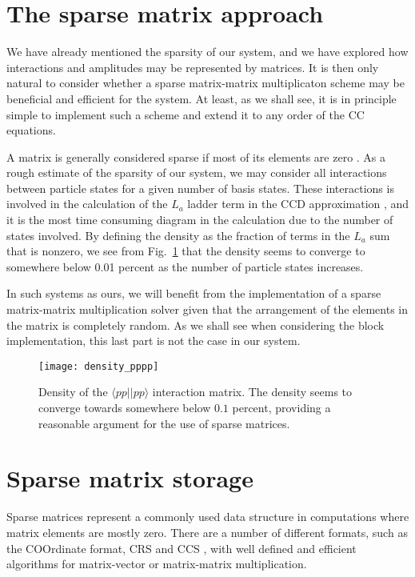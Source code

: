 \section{The sparse matrix approach}

We have already mentioned the sparsity of our system, and we have explored how interactions and amplitudes may be represented by matrices. It is then only natural to consider whether a sparse matrix-matrix  multiplicaton scheme may be beneficial and efficient for the system. At least, as we shall see, it is in principle simple to implement such a scheme and extend it to any order of the CC equations.

A matrix is generally considered sparse if most of its elements are
zero \cite[p.122]{Lay}. As a rough estimate of the sparsity of our
system, we may consider all interactions between particle states for a
given number of basis states. These interactions is involved in the
calculation of the $L_a$ ladder term in the CCD approximation
\cite{ShavittBartlett2009}, and it is the most time consuming diagram
in the calculation due to the number of states involved. By defining
the density as the fraction of terms in the $L_a$ sum that is nonzero,
we see from Fig.~\ref{fig:density_vpppp} that the density seems to
converge to somewhere below 0.01 percent as the number of particle
states increases.

In such systems as ours, we will benefit from the implementation of a
sparse matrix-matrix multiplication solver given that the arrangement
of the elements in the matrix is completely random. As we shall see
when considering the block implementation, this last part is not the
case in our system.

\begin{figure}[hbtp]
   \centering
   \texttt{[image: density\_pppp]}
   \caption{Density of the $\langle pp \vert \vert pp \rangle$ interaction matrix. The density seems to converge towards somewhere below $0.1$ percent, providing a reasonable argument for the use of sparse matrices.}
   \label{fig:density_vpppp}
\end{figure}

\FloatBarrier

\section{Sparse matrix storage}

Sparse matrices represent a commonly used data structure in
computations where matrix elements are mostly zero. There are a number
of different formats, such as the COOrdinate format, CRS and CCS
\cite{sparseformats}, with well defined and efficient algorithms for
matrix-vector or matrix-matrix multiplication.

